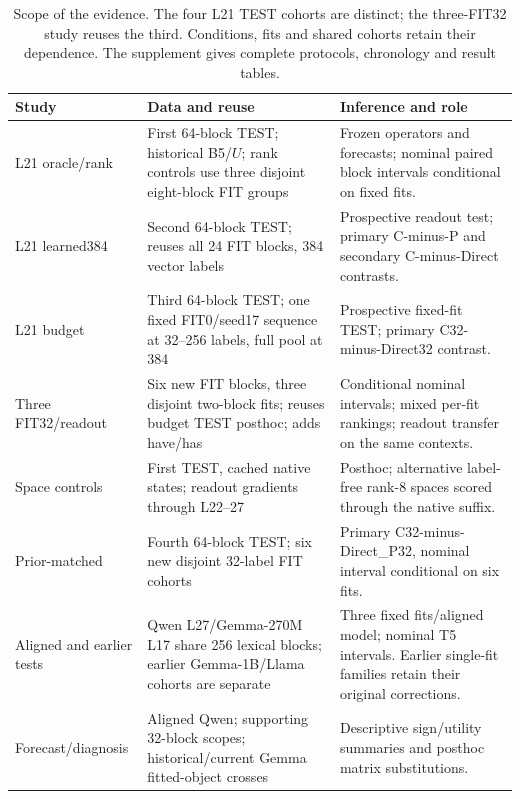 \documentclass[11pt]{article}
\begin{document}
\begin{table}[ht]\centering\scriptsize
\setlength{\tabcolsep}{4pt}
\begin{tabular}{>{\raggedright\arraybackslash}p{}>{\raggedright\arraybackslash}p{}>{\raggedright\arraybackslash}p{}}\toprule
Study & Data and reuse & Inference and role\\\midrule
L21 oracle/rank & First 64-block TEST; historical B5/$U$; rank controls use three disjoint eight-block FIT groups & Frozen operators and forecasts; nominal paired block intervals conditional on fixed fits.\\[3pt]
L21 learned384 & Second 64-block TEST; reuses all 24 FIT blocks, 384 vector labels & Prospective readout test; primary C-minus-P and secondary C-minus-Direct contrasts.\\[3pt]
L21 budget & Third 64-block TEST; one fixed FIT0/seed17 sequence at 32--256 labels, full pool at 384 & Prospective fixed-fit TEST; primary C32-minus-Direct32 contrast.\\[3pt]
Three FIT32/readout & Six new FIT blocks, three disjoint two-block fits; reuses budget TEST posthoc; adds have/has & Conditional nominal intervals; mixed per-fit rankings; readout transfer on the same contexts.\\[3pt]
Space controls & First TEST, cached native states; readout gradients through L22--27 & Posthoc; alternative label-free rank-8 spaces scored through the native suffix.\\[3pt]
Prior-matched & Fourth 64-block TEST; six new disjoint 32-label FIT cohorts & Primary C32-minus-Direct\_P32, nominal interval conditional on six fits.\\[3pt]
Aligned and earlier tests & Qwen L27/Gemma-270M L17 share 256 lexical blocks; earlier Gemma-1B/Llama cohorts are separate & Three fixed fits/aligned model; nominal T5 intervals. Earlier single-fit families retain their original corrections.\\[3pt]
Forecast/diagnosis & Aligned Qwen; supporting 32-block scopes; historical/current Gemma fitted-object crosses & Descriptive sign/utility summaries and posthoc matrix substitutions.\\\bottomrule
\end{tabular}
\caption{Scope of the evidence. The four L21 TEST cohorts are distinct; the three-FIT32 study reuses the third. Conditions, fits and shared cohorts retain their dependence. The supplement gives complete protocols, chronology and result tables.}\label{tab:scope}
\end{table}
\end{document}
